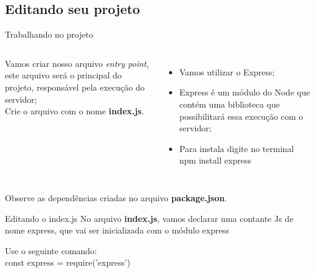 \documentclass{beamer}
\begin{document}
 \subsection{Editando seu projeto}
    \begin{frame}{Trabalhando no projeto}
      \begin{columns}[onlytextwidth]
         Vamos criar nosso arquivo \textit{entry point}, este arquivo será o principal do projeto, responsável pela execução do servidor;\\
        
          \vspace{0.5cm}
	Crie o arquivo com o nome \textbf{index.js}.
            \pause
            \begin{itemize}
		\item Vamos utilizar o Express;
		\item Express é um módulo do Node que contém uma biblioteca que possibilitará essa execução com o servidor;
		\item Para instala digite no terminal \alert{ npm install express}
	\end{itemize}
      \end{columns}
      Observe as dependências criadas no arquivo \textbf{package.json}.
    \end{frame}
    
    \begin{frame}[label=lists]{Editando o index.js}
	No arquivo \textbf{index.js}, vamos declarar uma contante Js de nome express, que vai ser inicializada com o módulo express
	
          \vspace{0.5cm}
          Use o seguinte comando:\\
          \alert{const express = require('express') }          
          
    \end{frame}
    
\end{document}
